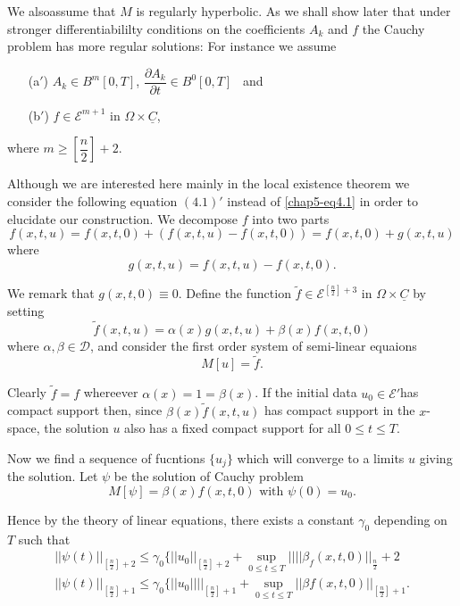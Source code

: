 We also\pageoriginale assume that $M$ is regularly hyperbolic. As we
shall show 
later that under stronger differentiabililty conditions on the
coefficients $A_k$ and $f$ the Cauchy problem has more regular
solutions: For instance we assume  
\begin{enumerate}
\item[(a$'$)] $A_k \in B^m [0, T]$, $\dfrac{\partial A_k}{\partial t}
  \in B^0 [0, T]$~ and  

\item[(b$'$)] $f \in \mathscr{E}^{m+1}$  in $ \Omega \times
  \underline{C}$,   
\end{enumerate}
where $m \geq \left[\dfrac{n}{2}\right] + 2$. 

Although we are interested here mainly in the local existence theorem
we consider the following equation $(4.1)'$ instead of
\eqref{chap5-eq4.1} in order 
to elucidate our construction. We decompose $f$ into two parts  
$$ 
f(x,t,u) = f(x,t,0) + (f(x,t,u) - f (x,t,0)) = f (x,t,0) + 
g(x,t,u) 
$$	
where
\begin{equation*}
 g(x,t,u ) = f(x, t, u) - f(x, t, 0). \tag{4.2}\label{chap5-eq4.2}
\end{equation*}

We remark that $g(x,t,0) \equiv 0$. Define the function
$\tilde{f}\in \mathscr{E}^{\left[\frac{n}{2}\right] + 3} $ in
$\Omega \times \underline{C}$ by setting   
$$
\tilde{f}(x, t, u) = \alpha (x) g (x, t, u) + \beta (x) f(x, t, 0)
$$
where $\alpha, \beta \in \mathscr{D}$, and consider the first
order system of semi-linear equaions  
\begin{equation*}
M[u] = \tilde{f}. \tag*{$(4.1)'$}
\end{equation*}

Clearly $\tilde{f} = f$ whereever $\alpha (x) = 1 = \beta (x)$. If the
initial data $u_0 \in \mathscr{E}'$\pageoriginale has compact
support then, 
since $\beta (x) \tilde{f} (x, t, u)$ has compact support in the
$x$-space, the solution $u$ also has a fixed compact support for all
$0 \leq t \leq T$.  

Now we find a sequence of fucntions $\{u_j\}$ which will converge to a
limits $u$ giving the solution. Let $\psi$ be the solution of Cauchy
problem  
\begin{equation*}
M[\psi] = \beta (x) f(x, t, 0) \text{ with }\psi (0) = u_0
. \tag{4.3}\label{chap5-eq4.3} 
\end{equation*}

Hence by the theory of linear equations, there exists a constant
$\gamma_0$ depending on $T$ such that  
\begin{gather*}
|| \psi (t)||_{\left[\frac{n}{2}\right]+2} \leq \gamma_0 \{ || u_0
||_{\left[\frac{n}{2} \right] + 2}+ \sup\limits_{0 \leq t \leq T} ||
||\beta_f (x, t, 0)||_{\frac{n}{2}}+2 \\ 
|| \psi (t) ||_{\left[\frac{n}{2}\right]+1} \leq \gamma_0 \{ || u_0 ||
||_{\left[\frac{n}{2}\right]+1} + \sup_{0 \leq t \leq T}|| \beta f
(x, t, 0)||_{\left[\frac{n}{2}\right]+1}. \tag{4.4}\label{chap5-eq4.4} 
\end{gather*}

